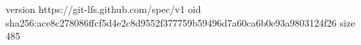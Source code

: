 version https://git-lfs.github.com/spec/v1
oid sha256:ace8c278086ffcf5d4e2c8d9552f377759b59496d7a60ca6b0e93a9803124f26
size 485
